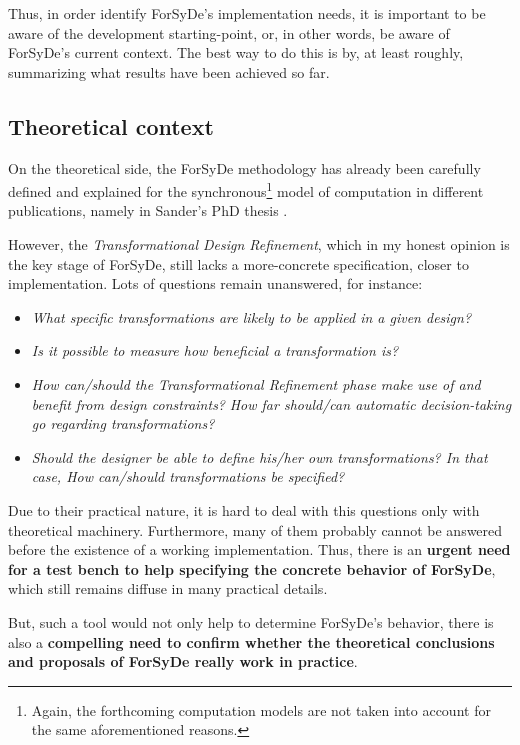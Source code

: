 \documentclass[a4paper,twoside,11pt]{article}
\begin{document}
Thus, in order identify ForSyDe's implementation needs, it is important to be
aware of the development starting-point, or, in other words, be aware of
ForSyDe's current context. The best way to do this is by, at least roughly,
summarizing what results have been achieved so far.

\subsection{Theoretical context}

On the theoretical side, the ForSyDe methodology has already been
carefully defined and explained for the synchronous\footnote{Again, the
  forthcoming computation models are not taken into account for the same
  aforementioned reasons.} model of computation in different publications,
namely in Sander's PhD thesis \cite{forsyde:thesis}.

However, the \textit{Transformational Design Refinement}, which in my honest
opinion is the key stage of ForSyDe, still lacks a more-concrete
specification, closer to implementation.  Lots of questions remain
unanswered, for instance:

  \begin{itemize}
  \item \textit{What specific transformations are likely to be applied in a
      given design?}
  \item \textit{Is it possible to measure how beneficial a transformation is?}
  \item \textit{How can/should the Transformational Refinement phase 
    make use of and benefit from design constraints?} 
    \textit{How far should/can automatic decision-taking go regarding
      transformations?}
  \item \textit{Should the designer be able to define his/her own
      transformations?  In that case, How can/should transformations be
      specified?}
  \end{itemize}

  Due to their practical nature, it is hard to deal with this questions only
  with theoretical machinery. Furthermore, many of them probably cannot be
  answered before the existence of a working implementation. Thus, there is an
  \textbf{urgent need for a test bench to help specifying the concrete
    behavior of ForSyDe}, which still remains diffuse in many practical
  details.
  
  But, such a tool would not only help to determine ForSyDe's behavior, there
  is also a \textbf{compelling need to confirm whether the theoretical
    conclusions and proposals of ForSyDe really work in practice}. 
\end{document}
